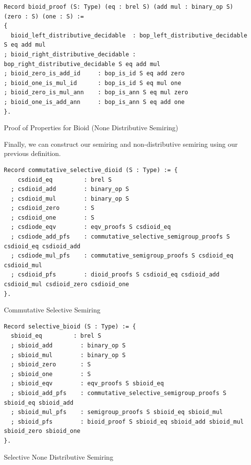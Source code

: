 \documentclass[a4paper,12pt,twoside,openright]{report}
\begin{document}
\begin{listing}[H]
\begin{verbatim}
Record bioid_proof (S: Type) (eq : brel S) (add mul : binary_op S) (zero : S) (one : S) :=
{  
  bioid_left_distributive_decidable  : bop_left_distributive_decidable S eq add mul
; bioid_right_distributive_decidable : bop_right_distributive_decidable S eq add mul
; bioid_zero_is_add_id     : bop_is_id S eq add zero
; bioid_one_is_mul_id      : bop_is_id S eq mul one                                                      
; bioid_zero_is_mul_ann    : bop_is_ann S eq mul zero
; bioid_one_is_add_ann     : bop_is_ann S eq add one
}.
\end{verbatim}
\caption{Proof of Properties for Bioid (None Distributive Semiring)} 
\label{coq:def:bioid_proof}
\end{listing}

Finally, we can construct our semiring and non-distributive semiring using our previous definition.

\begin{listing}[H]
\begin{verbatim}
Record commutative_selective_dioid (S : Type) := {
    csdioid_eq         : brel S  
  ; csdioid_add        : binary_op S
  ; csdioid_mul        : binary_op S                                   
  ; csdioid_zero       : S
  ; csdioid_one        : S
  ; csdiode_eqv        : eqv_proofs S csdioid_eq
  ; csdiode_add_pfs    : commutative_selective_semigroup_proofs S csdioid_eq csdioid_add 
  ; csdiode_mul_pfs    : commutative_semigroup_proofs S csdioid_eq csdioid_mul 
  ; csdioid_pfs        : dioid_proofs S csdioid_eq csdioid_add csdioid_mul csdioid_zero csdioid_one
}.
\end{verbatim}
\caption{Commutative Selective Semiring} 
\label{coq:def:commutative_selective_dioid}
\end{listing}

\begin{listing}[H]
\begin{verbatim}
Record selective_bioid (S : Type) := {
  sbioid_eq         : brel S  
  ; sbioid_add        : binary_op S
  ; sbioid_mul        : binary_op S                                   
  ; sbioid_zero       : S
  ; sbioid_one        : S
  ; sbioid_eqv        : eqv_proofs S sbioid_eq
  ; sbioid_add_pfs    : commutative_selective_semigroup_proofs S sbioid_eq sbioid_add 
  ; sbioid_mul_pfs    : semigroup_proofs S sbioid_eq sbioid_mul 
  ; sbioid_pfs        : bioid_proof S sbioid_eq sbioid_add sbioid_mul sbioid_zero sbioid_one
}.
\end{verbatim}
\caption{Selective None Distributive Semiring} 
\label{coq:def:selective_bioid}
\end{listing}
\end{document}
